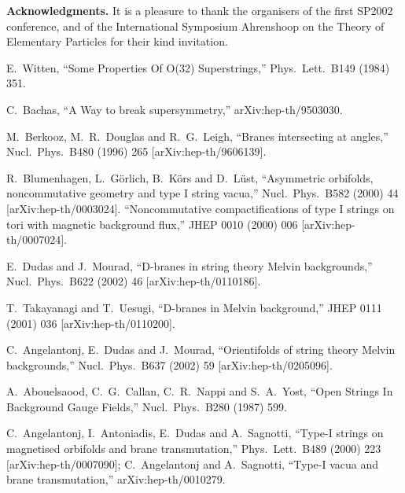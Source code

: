 \documentclass[a4paper,12pt]{article}
\begin{document}
\vskip 24pt

\noindent
{\bf Acknowledgments.} It is a pleasure to thank the organisers 
of the first SP2002 conference, and of the
\coordHE{} International Symposium Ahrenshoop on the  
Theory of Elementary Particles for their kind invitation.


\begin{thebibliography}{77}

 E.~Witten,
``Some Properties Of O(32) Superstrings,''
Phys.\ Lett.\ B149 (1984) 351.

 C.~Bachas,
``A Way to break supersymmetry,''
arXiv:hep-th/9503030.

 M.~Berkooz, M.~R.~Douglas and R.~G.~Leigh,
``Branes intersecting at angles,''
Nucl.\ Phys.\ B480 (1996) 265
[arXiv:hep-th/9606139].

 R.~Blumenhagen, L.~G\"orlich, B.~K\"ors and D.~L\"ust,
``Asymmetric orbifolds, noncommutative geometry and type I string vacua,''
Nucl.\ Phys.\ B582 (2000) 44
[arXiv:hep-th/0003024].
``Noncommutative compactifications of type I strings on tori with  
magnetic background flux,''
JHEP 0010 (2000) 006
[arXiv:hep-th/0007024].

 E.~Dudas and J.~Mourad,
``D-branes in string theory Melvin backgrounds,''
Nucl.\ Phys.\ B622 (2002) 46
[arXiv:hep-th/0110186].

 T.~Takayanagi and T.~Uesugi,
``D-branes in Melvin background,''
JHEP 0111 (2001) 036
[arXiv:hep-th/0110200].

 C.~Angelantonj, E.~Dudas and J.~Mourad,
``Orientifolds of string theory Melvin backgrounds,''
Nucl.\ Phys.\ B637 (2002) 59
[arXiv:hep-th/0205096].

A.~Abouelsaood, C.~G.~Callan, C.~R.~Nappi and S.~A.~Yost,
``Open Strings In Background Gauge Fields,''
Nucl.\ Phys.\ B280 (1987) 599.

 C.~Angelantonj, I.~Antoniadis, E.~Dudas and A.~Sagnotti,
``Type-I strings on magnetised orbifolds and brane transmutation,''
Phys.\ Lett.\ B489 (2000) 223
[arXiv:hep-th/0007090];
C.~Angelantonj and A.~Sagnotti,
``Type-I vacua and brane transmutation,''
arXiv:hep-th/0010279.


\end{thebibliography}
\end{document}
